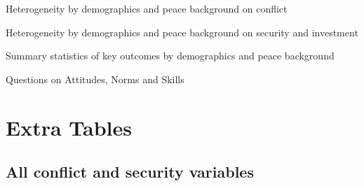 \documentclass[10pt]{article}
\begin{document}
\begin{landscape}
\begin{table}[H]
\caption{Heterogeneity by demographics and peace background on conflict}
\begin{center}
\begin{adjustbox}{max width = 1.5\textheight}

\end{adjustbox}
\end{center}
\end{table}

\begin{table}[H]
\caption{Heterogeneity by demographics and peace background on security and investment}
\begin{center}
\begin{adjustbox}{max width = 1.5\textheight}

\end{adjustbox}
\end{center}
\end{table}


\begin{table}[H]
\caption{Summary statistics of key outcomes by demographics and peace background}
\label{summary_stats_demo}
\begin{center}
\begin{adjustbox}{max width = 1.5\textheight}

\end{adjustbox}
\end{center}
\end{table}
\end{landscape}

\begin{table}[H]
\caption{Questions on Attitudes, Norms and Skills}
\begin{center}
\begin{adjustbox}{max width = 1.5\textheight}
\end{adjustbox}
\end{center}
\end{table}

\section{Extra Tables}
\clearpage
\setcounter{table}{0}   
\renewcommand{\thetable}{E.\arabic{table}}

\subsection{All conflict and security variables}
\end{document}
